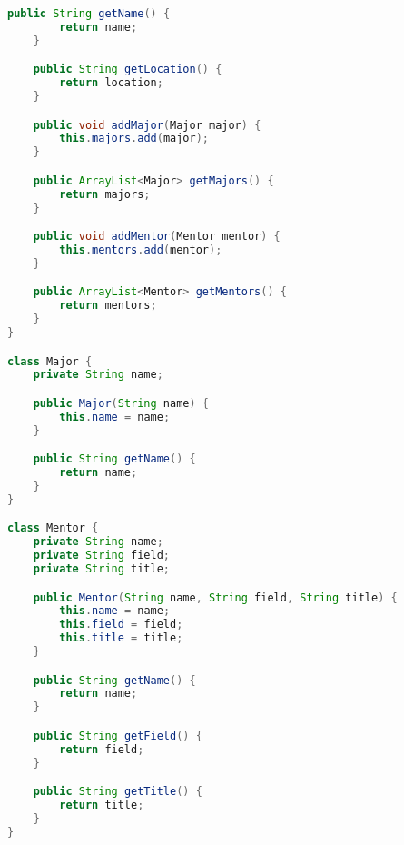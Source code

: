 \documentclass[UTF8]{ctexart}
\begin{document}
\begin{lstlisting}[language=java]
    public String getName() {
        return name;
    }

    public String getLocation() {
        return location;
    }

    public void addMajor(Major major) {
        this.majors.add(major);
    }

    public ArrayList<Major> getMajors() {
        return majors;
    }

    public void addMentor(Mentor mentor) {
        this.mentors.add(mentor);
    }

    public ArrayList<Mentor> getMentors() {
        return mentors;
    }
}

class Major {
    private String name;

    public Major(String name) {
        this.name = name;
    }

    public String getName() {
        return name;
    }
}

class Mentor {
    private String name;
    private String field;
    private String title;

    public Mentor(String name, String field, String title) {
        this.name = name;
        this.field = field;
        this.title = title;
    }

    public String getName() {
        return name;
    }

    public String getField() {
        return field;
    }

    public String getTitle() {
        return title;
    }
}
    \end{lstlisting}
\end{document}
